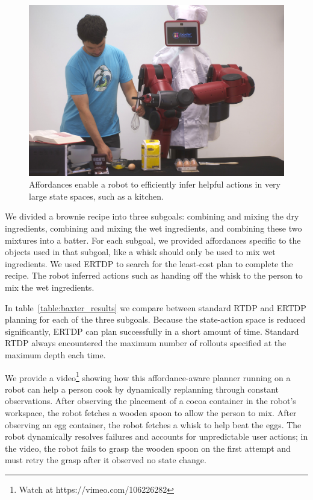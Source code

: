 \documentclass[letterpaper]{article}
\begin{document}
\begin{figure}[b]
\centering
\includegraphics[width=0.75\linewidth]{figures/baxter.jpg}%
  \caption{Affordances enable a robot to efficiently infer helpful actions in
    very large state spaces, such as a kitchen.}
  \label{fig:baxter_results}
\end{figure}

We divided a brownie recipe into three subgoals: combining and mixing the dry ingredients,
combining and mixing the wet ingredients, and combining these two
mixtures into a batter. For each subgoal, we provided affordances specific
to the objects used in that subgoal, like a whisk should only be used to mix wet ingredients.  
We used ERTDP to search for the least-cost plan
to complete the recipe.  The robot inferred actions such as handing
off the whisk to the person to mix the wet ingredients.


In table~\ref{table:baxter_results} we compare between
standard RTDP and ERTDP planning for each of the three subgoals. Because the
state-action space is reduced significantly,
ERTDP can plan successfully in a short amount of time. Standard RTDP always encountered
the maximum number of rollouts specified at the maximum depth each time.

We provide a video\footnote{Watch at https://vimeo.com/106226282} 
showing how this affordance-aware planner running
on a robot can help a person cook by dynamically replanning through
constant observations. After observing the placement of a cocoa
container in the robot's workspace, the robot fetches a wooden spoon
to allow the person to mix. After observing an egg container, the
robot fetches a whisk to help beat the eggs. 
The robot dynamically resolves failures and accounts for unpredictable
user actions; in the video, the robot fails to grasp the wooden spoon on
the first attempt and must retry the grasp after it observed no state
change.
\end{document}
